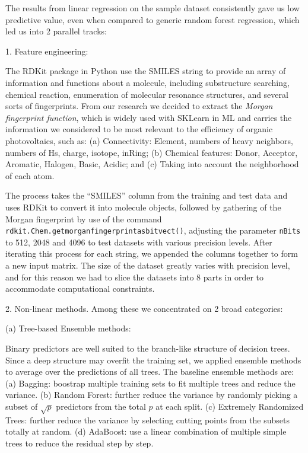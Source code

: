 \documentclass[11pt]{article}
\begin{document}
The results from linear regression on the sample dataset consistently gave us low predictive value, even when compared to generic random forest regression, which led us into 2 parallel tracks:


1. Feature engineering: 

The RDKit package in Python use the SMILES string to provide an array of information and functions about a molecule, including substructure searching, chemical reaction, enumeration of molecular resonance structures, and several sorts of fingerprints. From our research we decided to extract the \emph{Morgan fingerprint function}, which is widely used with SKLearn in ML and carries the information we considered to be most relevant to the efficiency of organic photovoltaics, such as: (a) Connectivity: Element, numbers of heavy neighbors, numbers of Hs, charge, isotope, inRing; (b) Chemical features: Donor, Acceptor, Aromatic, Halogen, Basic, Acidic; and (c) Taking into account the neighborhood of each atom.

The process takes the ``SMILES'' column from the training and test data and uses RDKit to convert it into molecule objects, followed by gathering of the Morgan fingerprint by use of the command \verb|rdkit.Chem.getmorganfingerprintasbitvect()|, adjusting the parameter \verb|nBits| to 512, 2048 and 4096 to test datasets with various precision levels. After iterating this process for each string, we appended the columns together to form a new input matrix. The size of the dataset greatly varies with precision level, and for this reason we had to slice the datasets into 8 parts in order to accommodate computational constraints.

2. Non-linear methods. Among these we concentrated on 2 broad categories:


(a) Tree-based Ensemble methods: 

Binary predictors are well suited to the branch-like structure of decision trees. Since a deep structure may overfit the training set, we applied ensemble methods to average over the predictions of all trees. The baseline ensemble methods are: (a) Bagging: boostrap multiple training sets to fit multiple trees and reduce the variance. (b) Random Forest: further reduce the variance by randomly picking a subset of $\sqrt{p}$ predictors from the total $p$ at each split. (c) Extremely Randomized Trees: further reduce the variance by selecting cutting points from the subsets totally at random. (d) AdaBoost: use a linear combination of multiple simple trees to reduce the residual step by step.
\end{document}
